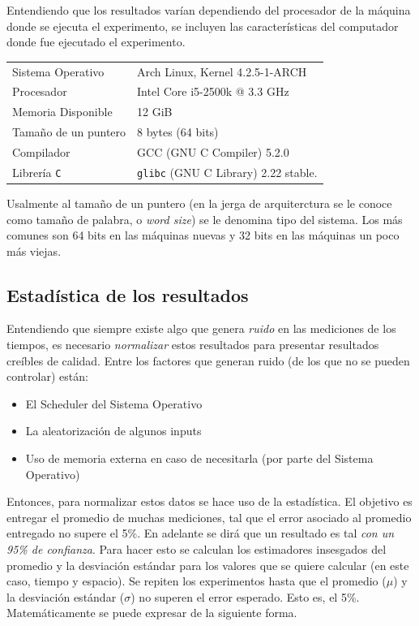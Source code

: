 \documentclass[12pt,letterpaper]{report}
\begin{document}
Entendiendo que los resultados varían dependiendo del procesador de la máquina donde se ejecuta el experimento, se incluyen las características del computador donde fue ejecutado el experimento.

\begin{center}

\begin{tabular}{ll}
  Sistema Operativo & Arch Linux, Kernel 4.2.5-1-ARCH\\
  Procesador & Intel Core i5-2500k @ 3.3 GHz\\
  Memoria Disponible & 12 GiB\\
  Tamaño de un puntero & 8 bytes (64 bits)\\
  Compilador & GCC (GNU C Compiler) 5.2.0\\
  Librería \texttt{C} & \texttt{glibc} (GNU C Library) 2.22 stable.
\end{tabular}
\end{center}

Usalmente al tamaño de un puntero (en la jerga de arquiterctura se le conoce como tamaño de palabra, o \emph{word size}) se le denomina tipo del sistema. Los más comunes son 64 bits en las máquinas nuevas y 32 bits en las máquinas un poco más viejas.

\subsection{Estadística de los resultados}
\label{subsec:estadistica}

Entendiendo que siempre existe algo que genera \emph{ruido} en las mediciones de los tiempos, es necesario \emph{normalizar} estos resultados para presentar resultados creíbles de calidad. Entre los factores que generan ruido (de los que no se pueden controlar) están:

\begin{itemize}
\item El Scheduler del Sistema Operativo
\item La aleatorización de algunos inputs
\item Uso de memoria externa en caso de necesitarla (por parte del Sistema Operativo)
\end{itemize}

Entonces, para normalizar estos datos se hace uso de la estadística. El objetivo es entregar el promedio de muchas mediciones, tal que el error asociado al promedio entregado no supere el 5\%. En adelante se dirá que un resultado es tal \emph{con un 95\% de confianza}. Para hacer esto se calculan los estimadores insesgados del promedio y la desviación estándar para los valores que se quiere calcular (en este caso, tiempo y espacio). Se repiten los experimentos hasta que el promedio ($\mu$) y la desviación estándar ($\sigma$) no superen el error esperado. Esto es, el 5\%. Matemáticamente se puede expresar de la siguiente forma.
\end{document}
